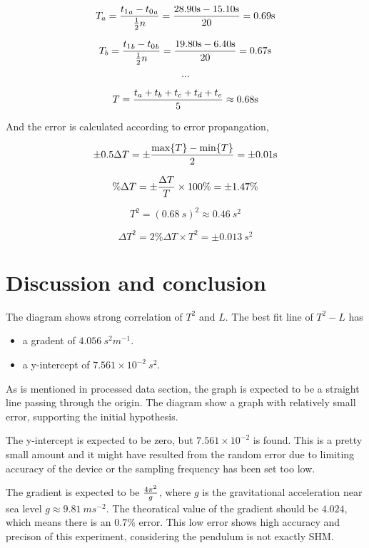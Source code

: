 \documentclass[a4paper]{article}
\begin{document}
$$T_a = {{t_1}_a - {t_0}_a \over \frac{1}{2}n} = {28.90 \SI{}{s} - 15.10 \SI{}{s} \over 20} = 0.69 \SI{}{s}$$

$$T_b = {{t_1}_b - {t_0}_b \over \frac{1}{2}n} ={ 19.80 \SI{}{s} - 6.40 \SI{}{s} \over 20} = 0.67 \SI{}{s}$$

$$\cdots$$

$$T = {t_a + t_b + t_c + t_d + t_e \over 5} \approx 0.68 \SI{}{s}$$

And the error is calculated according to error propangation,

$$\pm 0.5 \Delta T = \pm {\max\{T\} - \min\{T\} \over 2} = \pm 0.01 \SI{}{s}$$

$$\%\Delta T = \pm {\Delta T \over T} \times 100\% = \pm 1.47\%$$

$$T^2 = (0.68 \SI{}{s})^2 \approx 0.46 \SI{}{s^2}$$

$$\Delta T^2 = 2\%\Delta T \times T^2 = \pm 0.013 \SI{}{s^2}$$

\section{Discussion and conclusion}

The diagram shows strong correlation of $T^2$ and $L$. The best fit line of $T^2 - L$ has 

\begin{itemize}
    \item a gradent of $4.056 \SI{}{s^2m^{-1}}$.
    \item a y-intercept of $7.561\times 10^{-2} \SI{}{s^2}$.
\end{itemize}

As is mentioned in processed data section, the graph is expected to be a straight line passing through the origin. The diagram show a graph with relatively small error, supporting the initial hypothesis. 

The y-intercept is expected to be zero, but $7.561\times 10^{-2}$ is found. This is a pretty small amount and it might have resulted from the random error due to limiting accuracy of the device or the sampling frequency has been set too low.

The gradient is expected to be $4\pi^2 \over g$, where $g$ is the gravitational acceleration near sea level $g\approx \SI{9.81}{ms^{-2}}$. The theoratical value of the gradient should be $4.024$, which means there is an $0.7\%$ error. This low error shows high accuracy and precison of this experiment, considering the pendulum is not exactly SHM.
\end{document}
